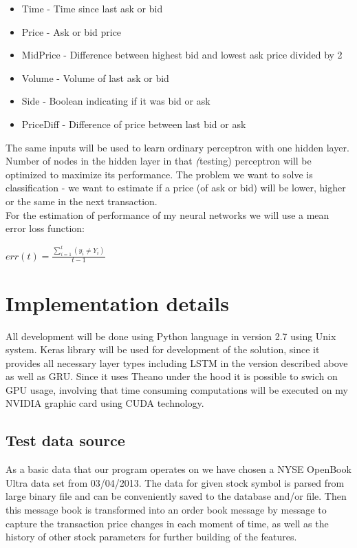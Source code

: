 \documentclass[twoside]{article}
\begin{document}
\begin{multicols}{2}
\begin{itemize}
\item Time - Time since last ask or bid
\item Price - Ask or bid price
\item MidPrice - Difference between highest bid and lowest ask price divided by 2
\item Volume - Volume of last ask or bid
\item Side - Boolean indicating if it was bid or ask
\item PriceDiff - Difference of price between last bid or ask
\end{itemize}

The same inputs will be used to learn ordinary perceptron with one hidden layer. 
Number of nodes in the hidden layer in that \emph(testing) perceptron will be optimized 
to maximize its performance. The problem we want to solve is classification - we want to estimate
if a price (of ask or bid) will be lower, higher or the same in the next transaction. \\
\newline
For the estimation of performance of my neural networks we will use a mean error loss function: \\
\newline
\begin{center}
$ err(t) = \frac{\sum\limits_{i=1}^t (y_{i} \neq Y_{i})}{t - 1} $
\end{center}

\section{Implementation details}

All development will be done using Python language in version 2.7 using Unix system.
Keras library will be used for development of the solution, since it provides all necessary 
layer types including LSTM in the version described above as well as GRU. Since it uses 
Theano under the hood it is possible to swich on GPU usage, involving that time consuming 
computations will be executed on my NVIDIA graphic card using CUDA technology.

\subsection{Test data source}
As a basic data that our program operates on we have chosen a NYSE OpenBook Ultra data set from 03/04/2013. The data for given stock symbol is parsed from large binary file and can be conveniently saved to the database and/or file. Then this message book is transformed into an order book message by message to capture the transaction price changes in each moment of time, as well as the history of other stock parameters for further building of the features.


\end{multicols}
\end{document}
